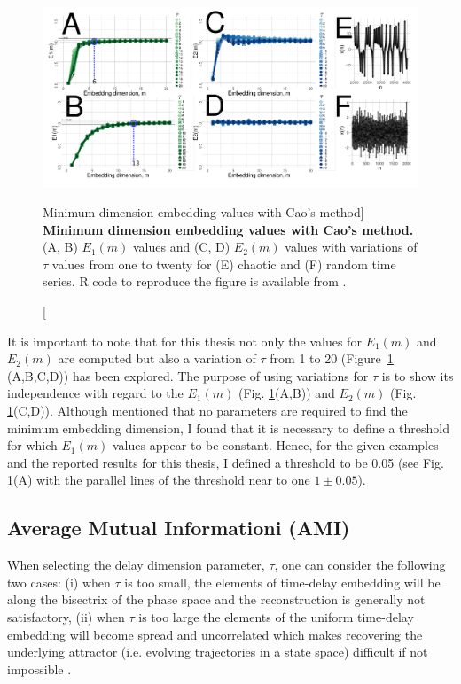 \begin{figure}[!h]
  \centering
  \includegraphics[width=1.0\textwidth]{cao}
    \caption
	[Minimum dimension embedding values with Cao's method]{
	{\bf Minimum dimension embedding values with Cao's method.} 
	(A, B) $E_1 (m)$ values and (C, D) $E_2(m)$ values 
	with variations of $\tau$ values from one to twenty
	for (E) chaotic and (F) random time series.
	R code to reproduce the figure is available from \cite{hwum2018}.
        }
    \label{fig:e1e2}
\end{figure}

It is important to note that for this thesis not only the values for 
$E_1(m)$ and $E_2(m)$ are computed but also a variation of $\tau$ from 
1 to 20 (Figure~\ref{fig:e1e2} (A,B,C,D)) has been explored. 
The purpose of using variations for $\tau$ is to show its independence 
with regard to the $E_1(m)$ (Fig. \ref{fig:e1e2}(A,B))
and $E_2(m)$ (Fig. \ref{fig:e1e2}(C,D)).
Although \cite{Cao1997} mentioned that no parameters are required to find
the minimum embedding dimension, I found that it is necessary to define a  
threshold for which $E_1(m)$ values appear to be constant. 
Hence, for the given examples and the reported results for this thesis, 
I defined a threshold to be 0.05 
(see Fig. \ref{fig:e1e2}(A) with the parallel lines of the threshold 
near to one $1\pm0.05$).

\subsection{Average Mutual Informationi (AMI)}
When selecting the delay dimension parameter, $\tau$, one can consider the 
following two cases:
(i) when $\tau$ is too small, the elements of time-delay embedding will be 
along the bisectrix of the phase space and the reconstruction is generally 
not satisfactory, 
(ii) when $\tau$ is too large the elements of the uniform 
time-delay embedding will become spread and uncorrelated which makes 
recovering the underlying attractor (i.e. evolving trajectories in a 
state space) difficult if not impossible 
\citep{casdagli1991, emrani2014a, garcia2005e71}.

